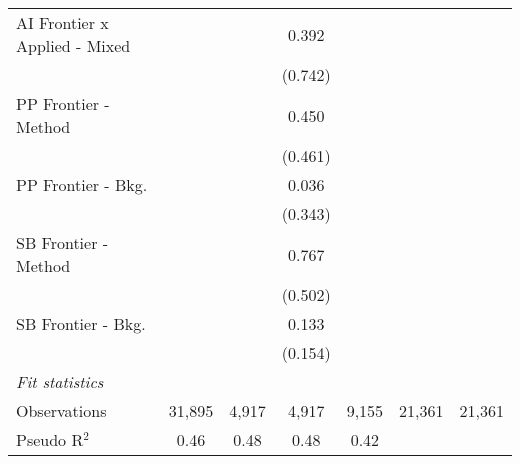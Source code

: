 \begin{tabular}{lcccccc}
   AI Frontier x Applied - Mixed &             &             & 0.392   &         &        &   \\   
                                 &             &             & (0.742) &         &        &   \\   
   PP Frontier - Method          &             &             & 0.450   &         &        &   \\   
                                 &             &             & (0.461) &         &        &   \\   
   PP Frontier - Bkg.            &             &             & 0.036   &         &        &   \\   
                                 &             &             & (0.343) &         &        &   \\   
   SB Frontier - Method          &             &             & 0.767   &         &        &   \\   
                                 &             &             & (0.502) &         &        &   \\   
   SB Frontier - Bkg.            &             &             & 0.133   &         &        &   \\   
                                 &             &             & (0.154) &         &        &   \\   
   \midrule
   \emph{Fit statistics}\\
   Observations                  & 31,895      & 4,917       & 4,917   & 9,155   & 21,361 & 21,361\\  
   Pseudo R$^2$                  & 0.46        & 0.48        & 0.48    & 0.42    &        & \\  
   

\end{tabular}
